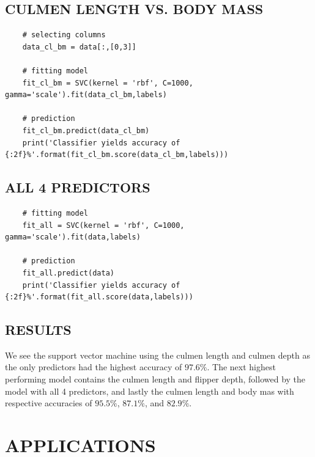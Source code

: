 \documentclass[12pt]{article}
\begin{document}
\subsection{CULMEN LENGTH VS. BODY MASS}

\begin{verbatim}
    # selecting columns
    data_cl_bm = data[:,[0,3]]

    # fitting model
    fit_cl_bm = SVC(kernel = 'rbf', C=1000, gamma='scale').fit(data_cl_bm,labels)

    # prediction
    fit_cl_bm.predict(data_cl_bm)
    print('Classifier yields accuracy of {:2f}%'.format(fit_cl_bm.score(data_cl_bm,labels)))
\end{verbatim}

\subsection{ALL 4 PREDICTORS}

\begin{verbatim}
    # fitting model
    fit_all = SVC(kernel = 'rbf', C=1000, gamma='scale').fit(data,labels)

    # prediction
    fit_all.predict(data)
    print('Classifier yields accuracy of {:2f}%'.format(fit_all.score(data,labels)))
\end{verbatim}

\subsection{RESULTS}

We see the support vector machine using the culmen length and culmen depth as the only predictors had the highest accuracy of $97.6\%$. The next highest performing model contains the culmen length and flipper depth, followed by the model with all 4 predictors, and lastly the culmen length and body mas with respective accuracies of $95.5\%$, $87.1\%$, and $82.9\%$.

\section{APPLICATIONS}
\end{document}
